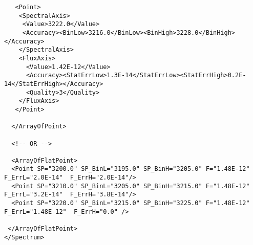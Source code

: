 {\begin{flushleft}
\begin{fmpage}
\begin{verbatim}
   <Point>
    <SpectralAxis>
     <Value>3222.0</Value>
     <Accuracy><BinLow>3216.0</BinLow><BinHigh>3228.0</BinHigh></Accuracy>
    </SpectralAxis>
    <FluxAxis>
      <Value>1.42E-12</Value>
      <Accuracy><StatErrLow>1.3E-14</StatErrLow><StatErrHigh>0.2E-14</StatErrHigh></Accuracy>
      <Quality>3</Quality>
    </FluxAxis>
   </Point>

  </ArrayOfPoint>

  <!-- OR -->

  <ArrayOfFlatPoint>
  <Point SP="3200.0" SP_BinL="3195.0" SP_BinH="3205.0" F="1.48E-12" F_ErrL="2.0E-14"  F_ErrH="2.0E-14"/>
  <Point SP="3210.0" SP_BinL="3205.0" SP_BinH="3215.0" F="1.48E-12" F_ErrL="3.2E-14"  F_ErrH="3.8E-14"/>
  <Point SP="3220.0" SP_BinL="3215.0" SP_BinH="3225.0" F="1.48E-12" F_ErrL="1.48E-12"  F_ErrH="0.0" />

 </ArrayOfFlatPoint>
</Spectrum>
\end{verbatim}
\end{fmpage}
\end{flushleft}
}


